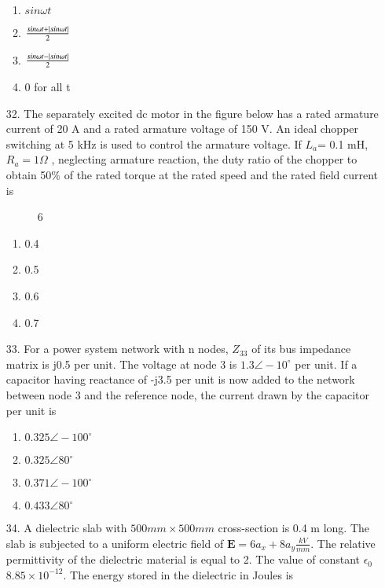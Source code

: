 \documentclass[journal]{IEEEtran}
\begin{document}
\begin{enumerate}
    \begin{enumerate}[label=(\Alph*)]
        \item $sin\omega t$
        \item $\frac{sin\omega t+\left\vert sin\omega t\right\vert}{2}$
        \item  $\frac{sin\omega t-\left\vert sin\omega t\right\vert}{2}$
        \item 0 for all t
    \end{enumerate}
    \item[32.] The separately excited dc motor in the figure below has a rated armature current of 20 A and a rated
    armature voltage of 150 V. An ideal chopper switching at 5 kHz is used to control the armature
    voltage. If $L_a$= 0.1 mH, $R_a= 1\varOmega$ , neglecting armature reaction, the duty ratio of the chopper to
    obtain 50\% of the rated torque at the rated speed and the rated field current is 
    \begin{figure}[!ht]
        \centering
        \caption{6}
    \end{figure}
    \begin{enumerate}[label=(\Alph*)]
        \item 0.4
        \item 0.5
        \item 0.6
        \item 0.7
    \end{enumerate}
    \item[33.] For a power system network with n nodes, $Z_33$ of its bus impedance matrix is j0.5 per unit. The
    voltage at node 3 is $1.3\angle-10^{\circ}$ per unit. If a capacitor having reactance of -j3.5 per unit is now
    added to the network between node 3 and the reference node, the current drawn by the capacitor per
    unit is 
    \begin{enumerate}[label=(\Alph*)]
        \item $0.325\angle-100^{\circ}$
        \item $0.325\angle80^{\circ}$
        \item $0.371\angle-100^{\circ}$
        \item $0.433\angle80^{\circ}$
    \end{enumerate}
    \item[34.] A dielectric slab with $500mm\times500 mm$ cross-section is 0.4 m long. The slab is subjected to a uniform
    electric field of $\mathbf{E}=6a_x + 8a_y \frac{kV}{mm}$. The relative permittivity of the dielectric material is equal to 2. The value of constant $\epsilon_0 $ $8.85\times 10^{-12}$. The energy stored in the dielectric in Joules is 
    

\end{enumerate}
\end{document}
